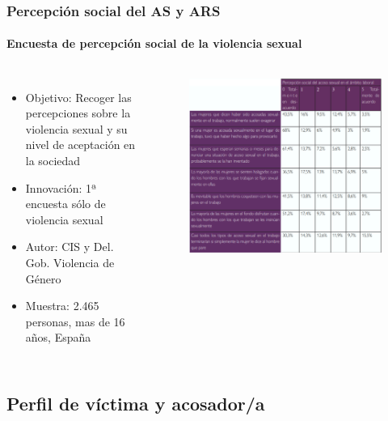 \documentclass{beamer}
\newcommand{\highlight}[1]{{\color{Blue} #1}}
\begin{document}
    \begin{frame}
        \frametitle{Percepción social del AS y ARS}
        \framesubtitle{Encuesta de percepción social de la violencia sexual}
        \begin{columns}
            \begin{itemize}
                \item \highlight{Objetivo}: Recoger las percepciones sobre la violencia sexual y su nivel de aceptación en la sociedad
                \item \highlight{Innovación}: 1ª encuesta sólo de violencia sexual
                \item \highlight{Autor}: CIS y Del. Gob. Violencia de Género
                \item \highlight{Muestra}: 2.465 personas, mas de 16 años, España
            \end{itemize}
            \begin{figure}
                \includegraphics[width=\textwidth]{assets/encuesta_percepcion_social.png}
            \end{figure}
        \end{columns}
    \end{frame}

    \subsection{Perfil de víctima y acosador/a}
\end{document}
